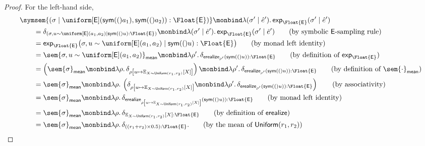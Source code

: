 \begin{proof}
For the left-hand side,
\begin{align}
  &\symsem{
    (\sigma \mid
    \uniform[\E](\sym(a_1),\sym(a_2)):\Float{\E})
  }
  \monbind
  \lambda(\sigma' \mid \hat e').\,
  \mathsf{exp}_{\Float{\E}}(\sigma' \mid \hat e')
  \notag
  \\
  &\qquad=
  \delta_{
    (\sigma,u\sim\uniform[\E](a_1,a_2)
    \mid \sym(u):\Float{\E})
  }
  \monbind
  \lambda(\sigma' \mid \hat e').\,
  \mathsf{exp}_{\Float{\E}}(\sigma' \mid \hat e')
  \tag{\text{by symbolic $\E$-sampling rule}}
  \\
  &\qquad=
  \mathsf{exp}_{\Float{\E}}
  \bigl(
    \sigma,u\sim\uniform[\E](a_1,a_2)
    \mid \sym(u):\Float{\E}
  \bigr)
  \tag{\text{by monad left identity}}
  \\
  &\qquad=
  \sem{\sigma,u\sim\uniform[\E](a_1,a_2)}_{\mathsf{mean}}
  \monbind
  \lambda\rho'.\,
  \delta_{\mathsf{erealize}_{\rho'}(\sym(u)):\Float{\E}}
  \tag{\text{by definition of $\mathsf{exp}_{\Float{\E}}$}}
  \\
  &\qquad=
  \left(
    \sem{\sigma}_{\mathsf{mean}}
    \monbind
    \lambda\rho.\,
    \delta_{
      \rho\left[
        u\mapsto
        \mathbb{E}_{X\sim\mathsf{Uniform}(r_1,r_2)}[X]
      \right]
    }
  \right)
  \monbind
  \lambda\rho'.\,
  \delta_{\mathsf{erealize}_{\rho'}(\sym(u)):\Float{\E}}
  \tag{\text{by definition of $\sem{\cdot}_{\mathsf{mean}}$}}
  \\
  &\qquad=
  \sem{\sigma}_{\mathsf{mean}}
  \monbind
  \lambda\rho.\,
  \left(
    \delta_{
      \rho\left[
        u\mapsto
        \mathbb{E}_{X\sim\mathsf{Uniform}(r_1,r_2)}[X]
      \right]
    }
    \monbind
    \lambda\rho'.\,
    \delta_{\mathsf{erealize}_{\rho'}(\sym(u)):\Float{\E}}
  \right)
  \tag{\text{by associativity}}
  \\
  &\qquad=
  \sem{\sigma}_{\mathsf{mean}}
  \monbind
  \lambda\rho.\,
  \delta_{
    \mathsf{erealize}_{
      \rho\left[
        u\mapsto
        \mathbb{E}_{X\sim\mathsf{Uniform}(r_1,r_2)}[X]
      \right]
    }
    (\sym(u))
    :\Float{\E}
  }
  \tag{\text{by monad left identity}}
  \\
  &\qquad=
  \sem{\sigma}_{\mathsf{mean}}
  \monbind
  \lambda\rho.\,
  \delta_{
    \mathbb{E}_{X\sim\mathsf{Uniform}(r_1,r_2)}[X]
    :\Float{\E}
  }
  \tag{\text{by definition of $\mathsf{erealize}$}}
  \\
  &\qquad=
  \sem{\sigma}_{\mathsf{mean}}
  \monbind
  \lambda\rho.\,
  \delta_{
    ((r_1+r_2)\times 0.5)
    :\Float{\E}
  }.
  \tag{\text{by the mean of $\mathsf{Uniform}(r_1,r_2)$}}
\end{align}


\end{proof}
